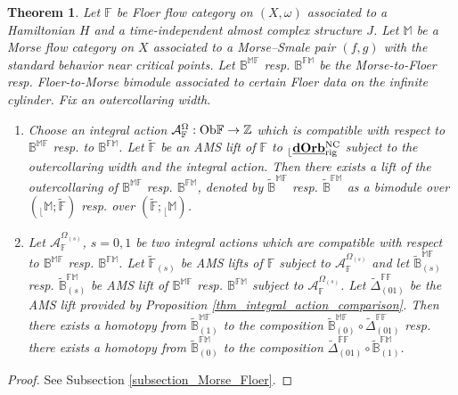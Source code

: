\documentclass[reqno, 10pt]{amsart}
\numberwithin{equation}{section}
\numberwithin{equation}{section}
\newtheorem{thma}{Theorem}
\theoremstyle{definition}
\theoremstyle{remark}
\newcommand{\mb}{\mathbb}
\newcommand{\mc}{\mathcal}
\renewcommand{\outer}{{}_{\lfloor}}
\newcommand{\uds}[1]{\underline{\smash{#1}}}
\begin{document}
\begin{thma}\label{thma_PSS_AMS}
Let ${\mb F}$ be Floer flow category on $(X, \omega)$ associated to a Hamiltonian $H$ and a time-independent almost complex structure $J$. Let ${\mb M}$ be a Morse flow category on $X$ associated to a Morse--Smale pair $(f, g)$ with the standard behavior near critical points. Let $\mb{B}^{\mb{MF}}$ resp. $\mb{B}^{\mb{FM}}$ be the Morse-to-Floer resp. Floer-to-Morse bimodule associated to certain Floer data on the infinite cylinder. Fix an outercollaring width. 

\begin{enumerate}

\item Choose an integral action ${\mc A}_{\mb F}^\Omega: {\rm Ob}{\mb F} \to {\mb Z}$ which is compatible with respect to $\mb{B}^{\mb{MF}}$ resp. to $\mb{B}^{\mb{FM}}$. Let $\tilde {\mb F}$ be an AMS lift of ${\mb F}$ to $\outer \uds{\bf dOrb}_{\rm rig}^{\rm NC}$ subject to the outercollaring width and the integral action. Then there exists a lift of the outercollaring of $\mb{B}^{\mb{MF}}$ resp. $\mb{B}^{\mb{FM}}$, denoted by $\tilde{\mb{B}}^{\mb{MF}}$ resp. $\tilde{\mb{B}}^{\mb{FM}}$ as a bimodule over $(\outer {\mb M}; \tilde {\mb F})$ resp. over $(\tilde {\mb F}; \outer {\mb M})$.

\item Let ${\mc A}_{\mb F}^{\Omega_{(s)}}$, $s = 0, 1$ be two integral actions which are compatible with respect to $\mb{B}^{\mb{MF}}$ resp. $\mb{B}^{\mb{FM}}$. Let $\tilde {\mb F}_{(s)}$ be AMS lifts of ${\mb F}$ subject to ${\mc A}_{\mb F}^{\Omega_{(s)}}$ and let $\tilde {\mb B}_{(s)}^{\mb{MF}}$ resp. $\tilde {\mb B}_{(s)}^{\mb{FM}}$ be AMS lift of $\mb{B}^{\mb{MF}}$ resp. $\mb{B}^{\mb{FM}}$ subject to ${\mc A}_{{\mb F}}^{\Omega_{(s)}}$. Let  $\tilde {\mb{\Delta}}_{(01)}^{\mb{FF}}$ be the AMS lift provided by Proposition \ref{thm_integral_action_comparison}. Then there exists a homotopy from $\tilde{\mb B}_{(1)}^{\mb{MF}}$ to the composition $\tilde{\mb B}_{(0)}^{\mb{MF}} \circ \tilde{\mb{\Delta}}_{(01)}^{\mb{FF}}$ resp. there exists a homotopy from $\tilde{\mb B}_{(0)}^{\mb{FM}}$ to the composition $\tilde{\mb{\Delta}}_{(01)}^{\mb{FF}} \circ \tilde{\mb B}_{(1)}^{\mb{FM}}$.
\end{enumerate}
\end{thma}


\begin{proof}
See Subsection \ref{subsection_Morse_Floer}.
\end{proof}
\end{document}
